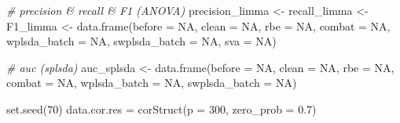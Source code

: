 \documentclass[
]{book}
\newenvironment{Shaded}{\begin{snugshade}}{\end{snugshade}}
\newcommand{\AttributeTok}[1]{\textcolor[rgb]{0.77,0.63,0.00}{#1}}
\newcommand{\CommentTok}[1]{\textcolor[rgb]{0.56,0.35,0.01}{\textit{#1}}}
\newcommand{\ConstantTok}[1]{\textcolor[rgb]{0.00,0.00,0.00}{#1}}
\newcommand{\DecValTok}[1]{\textcolor[rgb]{0.00,0.00,0.81}{#1}}
\newcommand{\FloatTok}[1]{\textcolor[rgb]{0.00,0.00,0.81}{#1}}
\newcommand{\FunctionTok}[1]{\textcolor[rgb]{0.00,0.00,0.00}{#1}}
\newcommand{\NormalTok}[1]{#1}
\newcommand{\OtherTok}[1]{\textcolor[rgb]{0.56,0.35,0.01}{#1}}
\begin{document}
\begin{Shaded}
\begin{Highlighting}[]
\CommentTok{\# precision \& recall \& F1 (ANOVA)}
\NormalTok{precision\_limma }\OtherTok{\textless{}{-}}\NormalTok{ recall\_limma }\OtherTok{\textless{}{-}}\NormalTok{ F1\_limma }\OtherTok{\textless{}{-}} 
  \FunctionTok{data.frame}\NormalTok{(}\AttributeTok{before =} \ConstantTok{NA}\NormalTok{, }\AttributeTok{clean =} \ConstantTok{NA}\NormalTok{, }
             \AttributeTok{rbe =} \ConstantTok{NA}\NormalTok{, }\AttributeTok{combat =} \ConstantTok{NA}\NormalTok{, }
             \AttributeTok{wplsda\_batch =} \ConstantTok{NA}\NormalTok{, }\AttributeTok{swplsda\_batch =} \ConstantTok{NA}\NormalTok{, }
             \AttributeTok{sva =} \ConstantTok{NA}\NormalTok{)}

\CommentTok{\# auc (splsda)}
\NormalTok{auc\_splsda }\OtherTok{\textless{}{-}} 
  \FunctionTok{data.frame}\NormalTok{(}\AttributeTok{before =} \ConstantTok{NA}\NormalTok{, }\AttributeTok{clean =} \ConstantTok{NA}\NormalTok{, }
             \AttributeTok{rbe =} \ConstantTok{NA}\NormalTok{, }\AttributeTok{combat =} \ConstantTok{NA}\NormalTok{, }
             \AttributeTok{wplsda\_batch =} \ConstantTok{NA}\NormalTok{, }\AttributeTok{swplsda\_batch =} \ConstantTok{NA}\NormalTok{)}


\FunctionTok{set.seed}\NormalTok{(}\DecValTok{70}\NormalTok{)}
\NormalTok{data.cor.res }\OtherTok{=} \FunctionTok{corStruct}\NormalTok{(}\AttributeTok{p =} \DecValTok{300}\NormalTok{, }\AttributeTok{zero\_prob =} \FloatTok{0.7}\NormalTok{)}


\end{Highlighting}
\end{Shaded}
\end{document}
